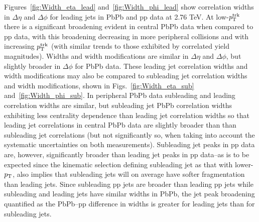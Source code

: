 Figures~\ref{fig:Width_eta_lead} and~\ref{fig:Width_phi_lead} show correlation widths in $\Delta\eta$ and $\Delta\phi$ for leading jets in PbPb and pp data at 2.76 TeV.   At low-$p_{\rm T}^{\rm trk}$ there is a significant broadening evident in central PbPb data when compared to pp data, with this broadening decreasing in more peripheral collisions and with increasing $p_{\rm T}^{\rm trk}$ (with similar trends to those exhibited by correlated yield magnitudes).  Widths and width modifications are similar in $\Delta\eta$ and $\Delta\phi$, but slightly broader in $\Delta\phi$ for PbPb data.  These leading jet correlation widths and width modifications may also be compared to subleading jet correlation widths and width modifications, shown in Figs.~\ref{fig:Width_eta_sub} and~\ref{fig:Width_phi_sub}.  In peripheral PbPb data subleading and leading correlation widths are similar, but subleading jet PbPb correlation widths exhibiting less centrality dependence than leading jet correlation widths so that leading jet correlations in central PbPb data are slightly broader than than subleading jet correlations (but not significantly so, when taking into account the systematic uncertainties on both measurements).  Subleading jet peaks in pp data are, however, significantly broader than leading jet peaks in pp data--as is to be expected since the kinematic selection defining subleading jet as that with lower-$p_{\rm T}$, also implies that subleading jets will on average have softer fragmentation than leading jets.  Since subleading pp jets are broader than leading pp jets while subleading and leading jets have similar widths in PbPb, the jet peak broadening quantified as the PbPb--pp difference in widths is greater for leading jets than for subleading jets.  

